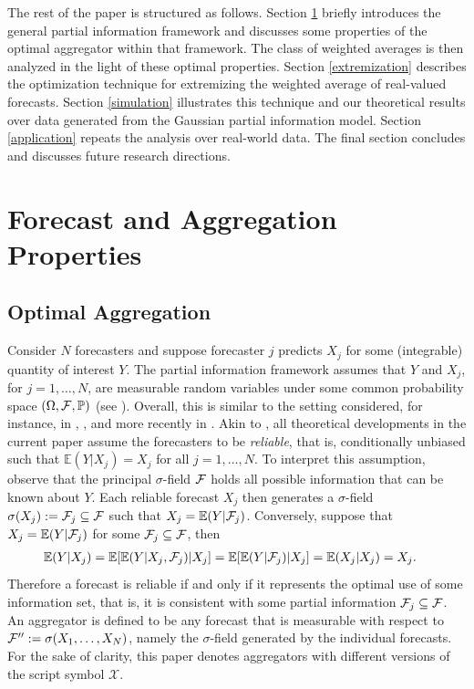 \documentclass[11pt]{article}
\renewcommand{\P}{\mathbb{P}}
\newcommand{\E}{\mathbb{E}}
\theoremstyle{definition}
\theoremstyle{definition}
\def\F{{\cal F}}
\def\P{{\mathbb P}}
\def\E{{\mathbb E}}
\begin{document}
The rest of the paper is structured as follows. Section \ref{propertiesS} briefly
introduces the general partial information framework and discusses some properties of
the optimal aggregator within that framework. The class of weighted
averages is then analyzed in the light of these optimal
properties. Section \ref{extremization} describes the optimization technique for extremizing the weighted average of
real-valued forecasts. Section \ref{simulation} illustrates this
technique and our theoretical results over
data generated from the Gaussian partial information model. Section \ref{application} repeats the analysis over real-world data. The final section
concludes and discusses future research directions.

\section{Forecast and Aggregation Properties} \label{propertiesS}
\subsection{Optimal Aggregation}


Consider $N$ forecasters and suppose forecaster $j$ predicts $X_j$ for
some (integrable) quantity of interest $Y$.  The partial information
framework assumes that $Y$ and $X_j$, for $j = 1, \dots, N$, are
measurable random variables under some common probability space
$(\Omega, \F , \P)$ (see \citealt{satopaamodeling}). Overall, this is similar to the setting
considered, for instance,
in \cite{degroot1981assessing}, \cite{murphy1987general}, and more
recently in \cite{Ranjan08}. Akin to \cite{Ranjan08},  all theoretical developments in the current paper assume the forecasters to be \textit{reliable}, that is, conditionally unbiased
such that $\E(Y | X_j) = X_j$ for all $j = 1, \dots, N$.  To interpret
this assumption, observe that the principal $\sigma$-field $\F$ holds
all possible information that can be known about $Y$. Each
reliable forecast $X_j$ then generates a $\sigma$-field
$\sigma(X_j) := \F_j \subseteq \F$ such that $X_j
= \E(Y|\F_j)$. Conversely, suppose that $X_j = \E(Y|\F_j)$ for some
$\F_j \subseteq \F$, then
\begin{align*}
\E(Y | X_j) &= \E[\E(Y|X_j,\F_j)|X_j] = \E[\E(Y|\F_j)|X_j] = \E(X_j|X_j) = X_j.
\end{align*}
Therefore a forecast is reliable if and only if it represents the optimal use of some information set, that is, it is consistent with some partial information $\F_j \subseteq \F$.
 An aggregator is defined to be any forecast that is measurable with respect to $\F'' := \sigma(X_1, \dots, X_N)$, namely the $\sigma$-field generated by the individual forecasts. For the sake of clarity, this paper denotes aggregators with different versions of the script symbol $\mathcal{X}$.
\end{document}
